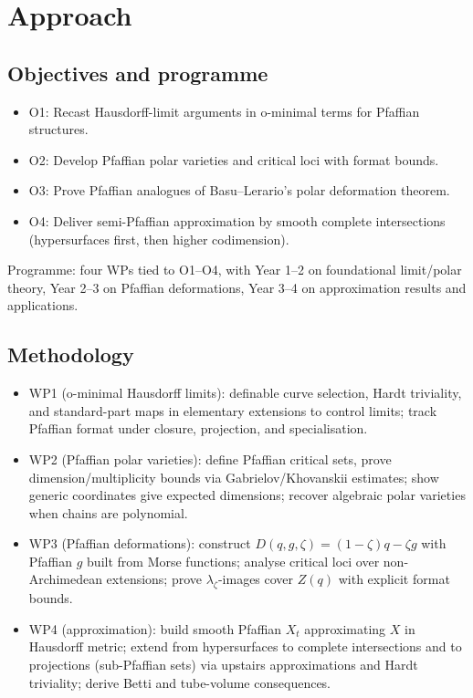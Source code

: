 \documentclass[11pt,a4paper]{article}
\begin{document}
\section{Approach}
\subsection*{Objectives and programme}
\begin{itemize}
  \item O1: Recast Hausdorff-limit arguments in o-minimal terms for Pfaffian structures.
  \item O2: Develop Pfaffian polar varieties and critical loci with format bounds.
  \item O3: Prove Pfaffian analogues of Basu--Lerario's polar deformation theorem.
  \item O4: Deliver semi-Pfaffian approximation by smooth complete intersections (hypersurfaces first, then higher codimension).
\end{itemize}
Programme: four WPs tied to O1--O4, with Year 1--2 on foundational limit/polar theory, Year 2--3 on Pfaffian deformations, Year 3--4 on approximation results and applications.

\subsection*{Methodology}
\begin{itemize}
  \item WP1 (o-minimal Hausdorff limits): definable curve selection, Hardt triviality, and standard-part maps in elementary extensions to control limits; track Pfaffian format under closure, projection, and specialisation.
  \item WP2 (Pfaffian polar varieties): define Pfaffian critical sets, prove dimension/multiplicity bounds via Gabrielov/Khovanskii estimates; show generic coordinates give expected dimensions; recover algebraic polar varieties when chains are polynomial.
  \item WP3 (Pfaffian deformations): construct \(D(q,g,\zeta)=(1-\zeta)q-\zeta g\) with Pfaffian \(g\) built from Morse functions; analyse critical loci over non-Archimedean extensions; prove \(\lambda_\zeta\)-images cover \(Z(q)\) with explicit format bounds.
  \item WP4 (approximation): build smooth Pfaffian \(X_t\) approximating \(X\) in Hausdorff metric; extend from hypersurfaces to complete intersections and to projections (sub-Pfaffian sets) via upstairs approximations and Hardt triviality; derive Betti and tube-volume consequences.
\end{itemize}
\end{document}

